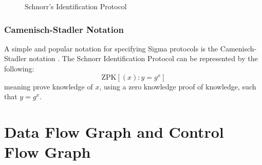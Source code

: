 \begin{figure}[hbt!]
  \centering
  \caption{Schnorr's Identification Protocol}
  \label{fig:schnorr_steps}
\end{figure}

\subsubsection{Camenisch-Stadler Notation}
\label{subsubsec:camenisch_stadler}

A simple and popular notation for specifying Sigma protocols is the
Camenisch-Stadler notation \cite{CACE, camenisch_stadler}. The Schnorr
Identification Protocol can be represented by the following:
\[
  \textrm{ZPK}\left[ (x): y = g^x \right]
\]
meaning prove knowledge of $x$, using a zero knowledge proof of
knowledge, such that $y=g^x$.

\section{Data Flow Graph and Control Flow Graph}

